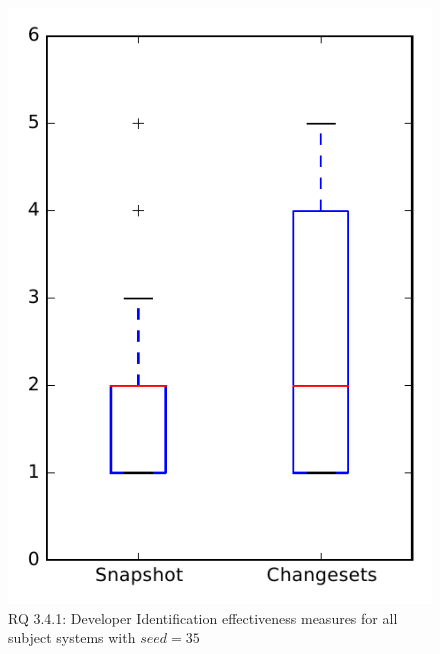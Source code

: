 
\begin{figure}
\centering
\includegraphics[height=0.4\textheight]{figures/dit_seed/rq1_overview_35}
\caption{RQ 3.4.1: Developer Identification effectiveness measures for all subject systems with $seed=35$}
\label{fig:dit_seed:rq1:overview}
\end{figure}
